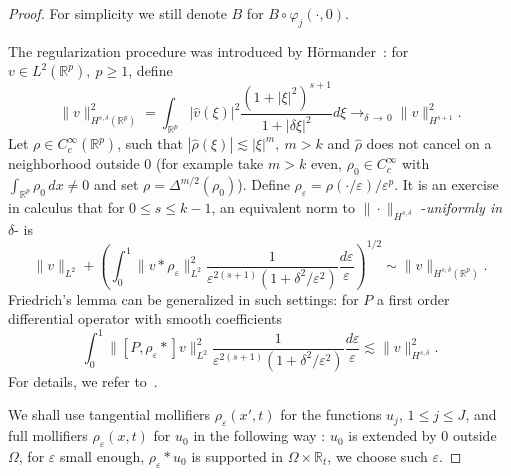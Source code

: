 \documentclass[10pt]{amsart}
\theoremstyle{definition}\newtheorem{defi}[theo]{Definition}\newtheorem{rema}[theo]{Remark}\newtheorem{exam}[theo]{Example}\newtheorem{exem}[theo]{Example}\newtheorem{nota}[theo]{Notation}
\newcommand{\R}{\mathbb{R}}
\newcommand{\rmn}{\mathrm{n}}
\begin{document}
\begin{proof}
For simplicity we still denote $B$ for $B\circ \varphi_j(\cdot,0)$.


The regularization procedure was introduced by H\"ormander~\cite{hormanderBVP}: for $v\in L^2(\R^p),\ p\geq 1$, define
\[
\|v\|_{H^{s,\delta}(\R^p)}^2=\int_{\R^p}|\widehat{v}(\xi)|^2
\frac{\left(1+|\xi|^2\right)^{s+1}}{1+|\delta \xi|^2}d\xi
\longrightarrow_{\delta\,\to\,0} \|v\|_{H^{s+1}}^2.
\]
Let $\rho\in C_c^\infty(\R^{p})$, such that $|\widehat{\rho}(\xi)|\lesssim |\xi|^{m},
\ m>k$ and $\widehat{\rho}$ does not cancel on a neighborhood outside $0$ (for example take $m>k$ even, $\rho_0\in C_c^\infty$ with $\int_{\R^p}\rho_0\,dx\neq 0$ and set $\rho=\Delta^{m/2}(\rho_0)$). Define $\rho_\varepsilon=\rho(\cdot/\varepsilon)/\varepsilon^p$. It is an exercise in calculus that for $0\leq s\leq k-1$, an equivalent norm to $\|\cdot\|_{H^{s,\delta}}$ -\emph{uniformly in} $\delta$- is
\begin{equation}\label{equivsobo}
\|v\|_{L^2}+\left(\int_0^1\|v*\rho_\varepsilon\|_{L^2}^2\frac{1} {\varepsilon^{2(s+1)}(1+\delta^2/\varepsilon^2)}\frac{d\varepsilon}{\varepsilon}\right)^{1/2}\sim
\|v\|_{H^{s,\delta}(\R^p)}.
\end{equation}
Friedrich's lemma can be generalized in such settings: for $P$ a first order differential operator with smooth coefficients
\begin{equation}\label{friedrichs}
\int_0^1\|[P,\rho_\varepsilon*]v\|_{L^2}^2\frac{1} {\varepsilon^{2(s+1)}(1+\delta^2/\varepsilon^2)}\frac{d\varepsilon}{\varepsilon}\lesssim \|v\|_{H^{s,\delta}}^2.
\end{equation}
For details, we refer to~\cite[Chapter~2, Section~6]{ChaPi}.


We shall use tangential mollifiers $\rho_\varepsilon(x',t)$ for the functions $u_j$, $1\leq j\leq J$, and full mollifiers $\rho_\varepsilon(x,t)$ for $u_0$ in the following way : $u_0$ is extended by $0$ outside $\Omega$, for $\varepsilon$ small enough, $\rho_\varepsilon*u_0$ is supported in $\Omega\times\R_t$, we choose such $\varepsilon$.



\end{proof}
\end{document}
